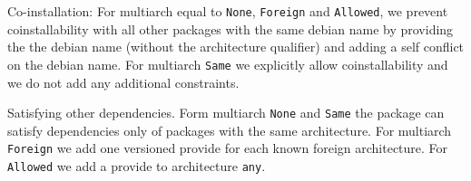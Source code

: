 \par{Co-installation}: For multiarch equal to \texttt{None}, \texttt{Foreign}
and \texttt{Allowed}, we prevent coinstallability with all other packages with
the same debian name by providing the the debian name (without the architecture
qualifier) and adding a self conflict on the debian name. For multiarch
\texttt{Same} we explicitly allow coinstallability and we do not add any
additional constraints.

\par{Satisfying other dependencies}. Form multiarch \texttt{None} and
\texttt{Same} the package can satisfy dependencies only of packages with the
same architecture. For multiarch \texttt{Foreign} we add one versioned provide
for each known foreign architecture. For \texttt{Allowed} we add a provide to
architecture \texttt{any}.

